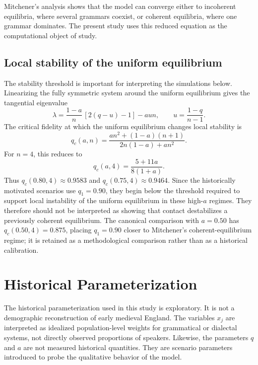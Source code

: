 \documentclass[11pt]{article}
\begin{document}
Mitchener's analysis shows that the model can converge either to incoherent equilibria, where several grammars coexist, or coherent equilibria, where one grammar dominates. The present study uses this reduced equation as the computational object of study.

\subsection{Local stability of the uniform equilibrium}

The stability threshold is important for interpreting the simulations below. Linearizing the fully symmetric system around the uniform equilibrium gives the tangential eigenvalue
\begin{equation}
\lambda
=
\frac{1-a}{n}\,[2(q-u)-1]
-
aun,
\qquad
u=\frac{1-q}{n-1}.
\label{eq:uniform-eigenvalue}
\end{equation}
The critical fidelity at which the uniform equilibrium changes local stability is
\begin{equation}
q_c(a,n)
=
\frac{a n^2+(1-a)(n+1)}
{2n(1-a)+a n^2}.
\label{eq:critical-q}
\end{equation}
For $n=4$, this reduces to
\begin{equation}
q_c(a,4)=\frac{5+11a}{8(1+a)}.
\label{eq:critical-q-n4}
\end{equation}
Thus $q_c(0.80,4)\approx 0.9583$ and $q_c(0.75,4)\approx 0.9464$. Since the historically motivated scenarios use $q_1=0.90$, they begin below the threshold required to support local instability of the uniform equilibrium in these high-$a$ regimes. They therefore should not be interpreted as showing that contact destabilizes a previously coherent equilibrium. The canonical comparison with $a=0.50$ has $q_c(0.50,4)=0.875$, placing $q_1=0.90$ closer to Mitchener's coherent-equilibrium regime; it is retained as a methodological comparison rather than as a historical calibration.

\section{Historical Parameterization}
\label{sec:historical-parameterization}

The historical parameterization used in this study is exploratory. It is not a demographic reconstruction of early medieval England. The variables $x_j$ are interpreted as idealized population-level weights for grammatical or dialectal systems, not directly observed proportions of speakers. Likewise, the parameters $q$ and $a$ are not measured historical quantities. They are scenario parameters introduced to probe the qualitative behavior of the model.
\end{document}
